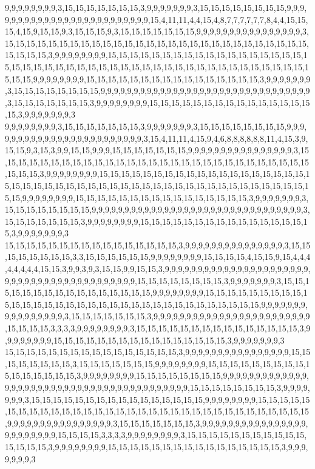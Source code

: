 9,9,9,9,9,9,9,9,3,15,15,15,15,15,15,15,3,9,9,9,9,9,9,9,3,15,15,15,15,15,15,15,15,9,9,9,9,9,9,9,9,9,9,9,9,9,9,9,9,9,9,9,9,9,9,9,9,9,15,4,11,11,4,4,15,4,8,7,7,7,7,7,7,8,4,4,15,15,15,4,15,9,15,15,9,3,15,15,15,9,3,15,15,15,15,15,15,15,9,9,9,9,9,9,9,9,9,9,9,9,9,9,9,9,3,15,15,15,15,15,15,15,15,15,15,15,15,15,15,15,15,15,15,15,15,15,15,15,15,15,15,15,15,15,15,15,15,3,9,9,9,9,9,9,9,9,15,15,15,15,15,15,15,15,15,15,15,15,15,15,15,15,15,15,15,15,15,15,15,15,15,15,15,15,15,15,15,15,15,15,15,15,15,15,15,15,15,15,15,15,15,15,15,15,15,9,9,9,9,9,9,9,9,15,15,15,15,15,15,15,15,15,15,15,15,15,15,15,15,3,9,9,9,9,9,9,9,3,15,15,15,15,15,15,15,15,9,9,9,9,9,9,9,9,9,9,9,9,9,9,9,9,9,9,9,9,9,9,9,9,9,9,9,9,9,9,9,9,3,15,15,15,15,15,15,15,3,9,9,9,9,9,9,9,9,15,15,15,15,15,15,15,15,15,15,15,15,15,15,15,15,3,9,9,9,9,9,9,9,3
9,9,9,9,9,9,9,9,3,15,15,15,15,15,15,15,3,9,9,9,9,9,9,9,3,15,15,15,15,15,15,15,15,9,9,9,9,9,9,9,9,9,9,9,9,9,9,9,9,9,9,9,9,9,9,9,9,3,15,4,11,11,4,15,9,4,6,8,8,8,8,8,8,11,4,15,3,9,15,15,9,3,15,3,9,9,15,15,9,9,9,15,15,15,15,15,15,15,9,9,9,9,9,9,9,9,9,9,9,9,9,9,9,9,3,15,15,15,15,15,15,15,15,15,15,15,15,15,15,15,15,15,15,15,15,15,15,15,15,15,15,15,15,15,15,15,15,3,9,9,9,9,9,9,9,9,15,15,15,15,15,15,15,15,15,15,15,15,15,15,15,15,15,15,15,15,15,15,15,15,15,15,15,15,15,15,15,15,15,15,15,15,15,15,15,15,15,15,15,15,15,15,15,15,15,9,9,9,9,9,9,9,9,15,15,15,15,15,15,15,15,15,15,15,15,15,15,15,15,3,9,9,9,9,9,9,9,3,15,15,15,15,15,15,15,15,9,9,9,9,9,9,9,9,9,9,9,9,9,9,9,9,9,9,9,9,9,9,9,9,9,9,9,9,9,9,9,9,3,15,15,15,15,15,15,15,3,9,9,9,9,9,9,9,9,15,15,15,15,15,15,15,15,15,15,15,15,15,15,15,15,3,9,9,9,9,9,9,9,3
15,15,15,15,15,15,15,15,15,15,15,15,15,15,15,15,3,9,9,9,9,9,9,9,9,9,9,9,9,9,9,9,3,15,15,15,15,15,15,15,15,3,3,15,15,15,15,15,15,9,9,9,9,9,9,9,9,15,15,15,15,4,15,15,9,15,4,4,4,4,4,4,4,4,15,15,3,9,9,3,9,3,15,15,9,9,15,15,3,9,9,9,9,9,9,9,9,9,9,9,9,9,9,9,9,9,9,9,9,9,9,9,9,9,9,9,9,9,9,9,9,9,9,9,9,9,9,9,9,9,9,15,15,15,15,15,15,15,15,3,9,9,9,9,9,9,9,3,15,15,15,15,15,15,15,15,15,15,15,15,15,15,15,15,9,9,9,9,9,9,9,9,15,15,15,15,15,15,15,15,15,15,15,15,15,15,15,15,15,15,15,15,15,15,15,15,15,15,15,15,15,15,15,15,15,9,9,9,9,9,9,9,9,9,9,9,9,9,9,9,9,3,15,15,15,15,15,15,15,3,9,9,9,9,9,9,9,9,9,9,9,9,9,9,9,9,9,9,9,9,9,9,9,9,15,15,15,15,3,3,3,3,9,9,9,9,9,9,9,9,3,15,15,15,15,15,15,15,15,15,15,15,15,15,15,15,3,9,9,9,9,9,9,9,9,15,15,15,15,15,15,15,15,15,15,15,15,15,15,15,15,3,9,9,9,9,9,9,9,3
15,15,15,15,15,15,15,15,15,15,15,15,15,15,15,15,3,9,9,9,9,9,9,9,9,9,9,9,9,9,9,9,9,15,15,15,15,15,15,15,15,3,15,15,15,15,15,15,15,9,9,9,9,9,9,9,9,15,15,15,15,15,15,15,15,15,15,15,15,15,15,15,15,3,9,9,9,9,9,9,9,9,15,15,15,15,15,15,15,15,9,9,9,9,9,9,9,9,9,9,9,9,9,9,9,9,9,9,9,9,9,9,9,9,9,9,9,9,9,9,9,9,9,9,9,9,9,9,9,9,9,15,15,15,15,15,15,15,15,3,9,9,9,9,9,9,9,3,15,15,15,15,15,15,15,15,15,15,15,15,15,15,15,15,9,9,9,9,9,9,9,9,15,15,15,15,15,15,15,15,15,15,15,15,15,15,15,15,15,15,15,15,15,15,15,15,15,15,15,15,15,15,15,15,15,9,9,9,9,9,9,9,9,9,9,9,9,9,9,9,9,3,15,15,15,15,15,15,15,3,9,9,9,9,9,9,9,9,9,9,9,9,9,9,9,9,9,9,9,9,9,9,9,9,15,15,15,15,3,3,3,3,9,9,9,9,9,9,9,9,3,15,15,15,15,15,15,15,15,15,15,15,15,15,15,15,3,9,9,9,9,9,9,9,9,15,15,15,15,15,15,15,15,15,15,15,15,15,15,15,15,3,9,9,9,9,9,9,9,3
